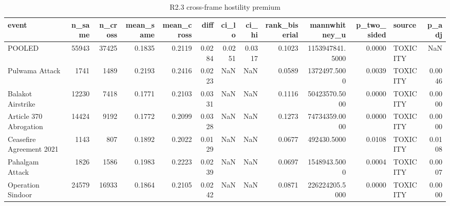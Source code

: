 \begin{table}
\caption{R2.3 cross-frame hostility premium}
\label{tab:r1r2_cross_frame_toxicity}
\begin{tabular}{lrrrrrrrrrrlr}
\toprule
event & n\_same & n\_cross & mean\_same & mean\_cross & diff & ci\_lo & ci\_hi & rank\_biserial & mannwhitney\_u & p\_two\_sided & source & p\_adj \\
\midrule
POOLED & 55943 & 37425 & 0.1835 & 0.2119 & 0.0284 & 0.0251 & 0.0317 & 0.1023 & 1153947841.5000 & 0.0000 & TOXICITY & NaN \\
Pulwama Attack & 1741 & 1489 & 0.2193 & 0.2416 & 0.0223 & NaN & NaN & 0.0589 & 1372497.5000 & 0.0039 & TOXICITY & 0.0046 \\
Balakot Airstrike & 12230 & 7418 & 0.1771 & 0.2103 & 0.0331 & NaN & NaN & 0.1116 & 50423570.5000 & 0.0000 & TOXICITY & 0.0000 \\
Article 370 Abrogation & 14424 & 9192 & 0.1772 & 0.2099 & 0.0328 & NaN & NaN & 0.1273 & 74734359.0000 & 0.0000 & TOXICITY & 0.0000 \\
Ceasefire Agreement 2021 & 1143 & 807 & 0.1892 & 0.2022 & 0.0129 & NaN & NaN & 0.0677 & 492430.5000 & 0.0108 & TOXICITY & 0.0108 \\
Pahalgam Attack & 1826 & 1586 & 0.1983 & 0.2223 & 0.0239 & NaN & NaN & 0.0697 & 1548943.5000 & 0.0004 & TOXICITY & 0.0007 \\
Operation Sindoor & 24579 & 16933 & 0.1864 & 0.2105 & 0.0242 & NaN & NaN & 0.0871 & 226224205.5000 & 0.0000 & TOXICITY & 0.0000 \\
\bottomrule
\end{tabular}
\end{table}
